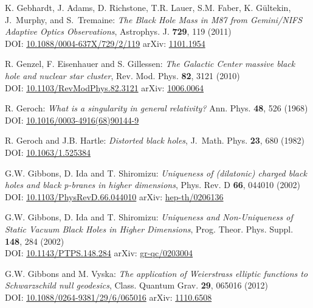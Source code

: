 \begin{thebibliography}{123}
K. Gebhardt, J. Adams, D. Richstone, T.R. Lauer, S.M. Faber, K. Gültekin, J.~Murphy, and S.~Tremaine:
{\em The Black Hole Mass in M87 from Gemini/NIFS Adaptive Optics Observations},
Astrophys. J. {\bf 729}, 119 (2011)\\
DOI: \href{https://doi.org/10.1088/0004-637X/729/2/119}{10.1088/0004-637X/729/2/119}\hfill
arXiv: \href{https://arxiv.org/abs/1101.1954}{1101.1954}

R. Genzel, F. Eisenhauer and S. Gillessen:
{\em The Galactic Center massive black hole and nuclear star cluster},
Rev. Mod. Phys. {\bf 82}, 3121 (2010)\\
DOI: \href{https://doi.org/10.1103/RevModPhys.82.3121}{10.1103/RevModPhys.82.3121}\hfill
arXiv: \href{https://arxiv.org/abs/1006.0064}{1006.0064}

R. Geroch:
{\em What is a singularity in general relativity?}
Ann. Phys. {\bf 48}, 526 (1968)\\
DOI: \href{https://doi.org/10.1016/0003-4916(68)90144-9}{10.1016/0003-4916(68)90144-9}

R. Geroch and J.B. Hartle:
{\em Distorted black holes},
J.~Math. Phys. {\bf 23}, 680 (1982)\\
DOI: \href{https://doi.org/10.1063/1.525384}{10.1063/1.525384}

G.W. Gibbons, D. Ida and T. Shiromizu:
{\em Uniqueness of (dilatonic) charged black holes and black p-branes in higher dimensions},
Phys. Rev. D {\bf 66}, 044010 (2002)\\
DOI: \href{https://doi.org/10.1103/PhysRevD.66.044010}{10.1103/PhysRevD.66.044010}\hfill
arXiv: \href{https://arxiv.org/abs/hep-th/0206136}{hep-th/0206136}

G.W. Gibbons, D. Ida and T. Shiromizu:
{\em Uniqueness and Non-Uniqueness of Static Vacuum Black Holes in Higher Dimensions},
Prog. Theor. Phys. Suppl. {\bf 148}, 284 (2002)\\
DOI: \href{https://doi.org/10.1143/PTPS.148.284}{10.1143/PTPS.148.284}\hfill
arXiv: \href{https://arxiv.org/abs/gr-qc/0203004}{gr-qc/0203004}

G.W. Gibbons and M. Vyska:
{\em The application of Weierstrass elliptic functions to Schwarzschild null geodesics},
Class. Quantum Grav. {\bf 29}, 065016 (2012)\\
DOI: \href{https://doi.org/10.1088/0264-9381/29/6/065016}{10.1088/0264-9381/29/6/065016}\hfill
arXiv: \href{https://arxiv.org/abs/1110.6508}{1110.6508}


\end{thebibliography}
